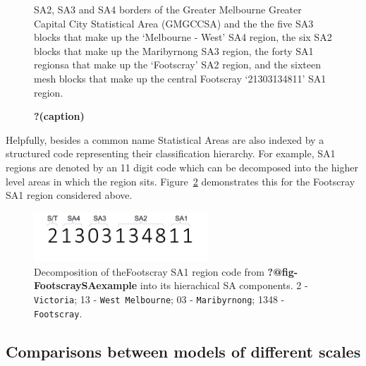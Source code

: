 \documentclass[
  letterpaper,
  DIV=11,
  numbers=noendperiod]{scrartcl}
\begin{document}
\begin{figure}

\begin{minipage}[t]{0.50\linewidth}

{\centering 

SA2, SA3 and SA4 borders of the Greater Melbourne Greater Capital City
Statistical Area (GMGCCSA) and the the five SA3 blocks that make up the
`Melbourne - West' SA4 region, the six SA2 blocks that make up the
Maribyrnong SA3 region, the forty SA1 regionsa that make up the
`Footscray' SA2 region, and the sixteen mesh blocks that make up the
central Footscray `21303134811' SA1 region.

}

\end{minipage}%

\caption{\label{fig-GMelbSA2SA3SA4}\textbf{?(caption)}}

\end{figure}

Helpfully, besides a common name Statistical Areas are also indexed by a
structured code representing their classification hierarchy. For
example, SA1 regions are denoted by an 11 digit code which can be
decomposed into the higher level areas in which the region sits.
Figure~\ref{fig-FootscraySA1Code} demonstrates this for the Footscray
SA1 region considered above.

\begin{figure}

{\centering \includegraphics[width=2.58333in,height=\textheight]{figures/FootscraySA1eg.png}

}

\caption{\label{fig-FootscraySA1Code}Decomposition of theFootscray SA1
region code from \textbf{?@fig-FootscraySAexample} into its hierachical
SA components. 2 - \texttt{Victoria}; 13 - \texttt{West\ Melbourne}; 03
- \texttt{Maribyrnong}; 1348 - \texttt{Footscray}.}

\end{figure}

\hypertarget{comparisons-between-models-of-different-scales}{%
\subsection{Comparisons between models of different
scales}\label{comparisons-between-models-of-different-scales}}
\end{document}
